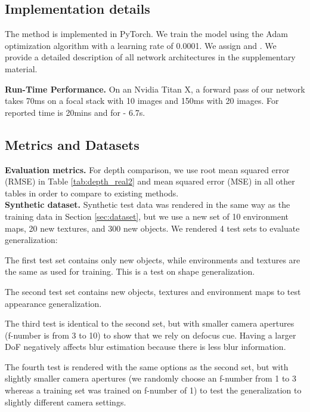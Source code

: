 \documentclass[10pt,twocolumn,letterpaper]{article}
\begin{document}
\subsection{Implementation details}
The method is implemented in PyTorch\cite{pytorch}. We train the model using the
Adam optimization algorithm \cite{adam_opt} with a learning rate of 0.0001.
We assign  and . 
We provide a detailed description of all network architectures in the supplementary material.


\noindent\textbf{Run-Time Performance.} On an Nvidia Titan X, a forward pass of our network takes 70ms on a focal stack with 10 images and 150ms with 20 images. For \cite{Suwajanakorn15} reported time is 20mins and for \cite{Surh17} - 6.7s.



\subsection{Metrics and Datasets} \label{sec:test_dataset}

\noindent\textbf{Evaluation metrics.} For depth comparison, we use root mean squared error (RMSE) in Table \ref{tab:depth_real2} and mean squared error (MSE) in all other tables in order to compare to existing methods.\\


\vspace{-0.5cm}
\noindent\textbf{Synthetic dataset.}
Synthetic test data was rendered in the same way as the training data in Section \ref{sec:dataset}, but we use a new set of 10 environment maps, 20 new textures, and 300 new objects. 
We rendered 4 test sets to evaluate generalization: 



 The first test set contains only new objects, while environments and textures are the same as used for training. This is a test on shape generalization.

 The second test set contains new objects, textures and environment maps to test appearance generalization.

 The third test is identical to the second set, but with smaller camera apertures (f-number is from 3 to 10)  to show that we rely on defocus cue. Having a larger DoF negatively affects blur estimation because there is less blur information. 

 The fourth test is rendered with the same options as the second set, but with  slightly smaller camera apertures (we randomly choose an f-number from 1 to 3 whereas a training set was trained on f-number of 1) to test the generalization to slightly different camera settings. 
\end{document}
